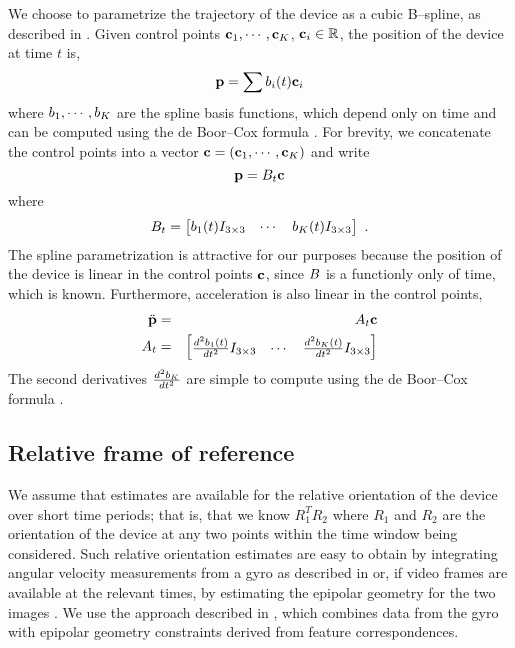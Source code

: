 We choose to parametrize the trajectory of the device as a cubic
B--spline, as described in \cite{furgale,lovegrove}. Given
control points $\mathbf{c}_1,\cdots,\mathbf{c}_K$, $\mathbf{c}_i \in
\mathbb{R}$, the position of the device at time $t$ is,
\begin{equation}
  \mathbf{p} = \sum b_i(t) \mathbf{c}_i
\end{equation}
where $b_1,\cdots,b_K$ are the spline basis
functions, which depend only on time and can be computed using the de
Boor--Cox formula \cite{deboor1978}. For brevity, we concatenate the
control points into a vector
$\mathbf{c}=(\mathbf{c}_1,\cdots,\mathbf{c}_K)$ and write
\begin{equation}
  \mathbf{p} = B_t \mathbf{c}
\end{equation}
where
\begin{equation}
  B_t =
  \begin{bmatrix}
    b_1(t) I_{3 \times 3} &
    \cdots &
    b_K(t) I_{3 \times 3}
  \end{bmatrix} ~.
\end{equation}
The spline parametrization is attractive for our purposes because the
position of the device is linear in the control points $\mathbf{c}$,
since $B$ is a functionly only of time, which is
known. Furthermore, acceleration is also linear in the control points,
\begin{eqnarray}
  \ddot{\mathbf{p}} &=& A_t \mathbf{c} \\
  A_t &=&
  \begin{bmatrix}
    \frac{d^2b_1(t)}{dt^2} I_{3 \times 3} &
    \cdots &
    \frac{d^2b_K(t)}{dt^2} I_{3 \times 3}
  \end{bmatrix}
\end{eqnarray}
The second derivatives $\frac{d^2b_K}{dt^2}$ are simple to
compute using the de Boor--Cox formula \cite{deboor1978}.

\subsection{Relative frame of reference}

We assume that estimates are available for the relative orientation of
the device over short time periods; that is, that we know $R_1^TR_2$
where $R_1$ and $R_2$ are the orientation of the device at any two
points within the time window being considered. Such relative
orientation estimates are easy to obtain by integrating angular
velocity measurements from a gyro as described in
\cite{StergiosOrientationFilter} or, if video frames are available at
the relevant times, by estimating the epipolar geometry for the two
images \cite{Zisserman}. We use the approach described in
\cite{Whatever}, which combines data from the gyro with epipolar
geometry constraints derived from feature correspondences.

